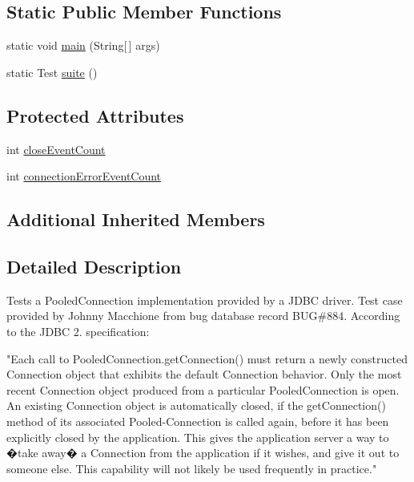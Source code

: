 \subsection*{Static Public Member Functions}
\begin{DoxyCompactItemize}
\item 
static void \mbox{\hyperlink{classtestsuite_1_1regression_1_1_pooled_connection_regression_test_a5c9f916248ffe26706b18f99e4f1246a}{main}} (String\mbox{[}$\,$\mbox{]} args)
\item 
static Test \mbox{\hyperlink{classtestsuite_1_1regression_1_1_pooled_connection_regression_test_ab5bce0e84e27d7745cb282860fe3297f}{suite}} ()
\end{DoxyCompactItemize}
\subsection*{Protected Attributes}
\begin{DoxyCompactItemize}
\item 
int \mbox{\hyperlink{classtestsuite_1_1regression_1_1_pooled_connection_regression_test_ad10232005bb57d1bd35f4f73a363c51a}{close\+Event\+Count}}
\item 
int \mbox{\hyperlink{classtestsuite_1_1regression_1_1_pooled_connection_regression_test_a84de35b9e122bb662e4c5947849b7383}{connection\+Error\+Event\+Count}}
\end{DoxyCompactItemize}
\subsection*{Additional Inherited Members}


\subsection{Detailed Description}
Tests a Pooled\+Connection implementation provided by a J\+D\+BC driver. Test case provided by Johnny Macchione from bug database record B\+UG\#884. According to the J\+D\+BC 2. specification\+:

"Each call to Pooled\+Connection.\+get\+Connection() must return a newly constructed Connection object that exhibits the default Connection behavior. Only the most recent Connection object produced from a particular Pooled\+Connection is open. An existing Connection object is automatically closed, if the get\+Connection() method of its associated Pooled-\/\+Connection is called again, before it has been explicitly closed by the application. This gives the application server a way to �take away� a Connection from the application if it wishes, and give it out to someone else. This capability will not likely be used frequently in practice." 

